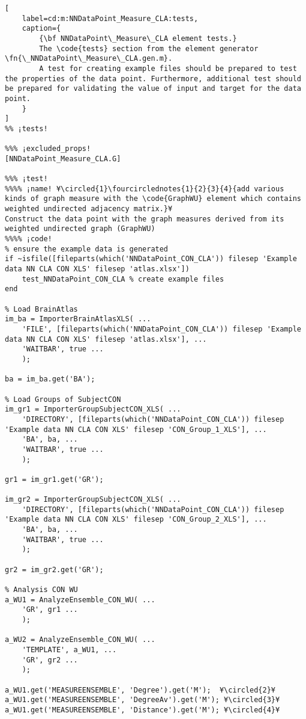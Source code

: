 \documentclass{tufte-handout}
\begin{document}
\begin{lstlisting}[
	label=cd:m:NNDataPoint_Measure_CLA:tests,
	caption={
		{\bf NNDataPoint\_Measure\_CLA element tests.}
		The \code{tests} section from the element generator \fn{\_NNDataPoint\_Measure\_CLA.gen.m}.
		A test for creating example files should be prepared to test the properties of the data point. Furthermore, additional test should be prepared for validating the value of input and target for the data point.
	}
]		
%% ¡tests!

%%% ¡excluded_props!
[NNDataPoint_Measure_CLA.G]

%%% ¡test!
%%%% ¡name! ¥\circled{1}\fourcirclednotes{1}{2}{3}{4}{add various kinds of graph measure with the \code{GraphWU} element which contains weighted undirected adjacency matrix.}¥
Construct the data point with the graph measures derived from its weighted undirected graph (GraphWU) 
%%%% ¡code!
% ensure the example data is generated
if ~isfile([fileparts(which('NNDataPoint_CON_CLA')) filesep 'Example data NN CLA CON XLS' filesep 'atlas.xlsx'])
    test_NNDataPoint_CON_CLA % create example files
end

% Load BrainAtlas
im_ba = ImporterBrainAtlasXLS( ...
    'FILE', [fileparts(which('NNDataPoint_CON_CLA')) filesep 'Example data NN CLA CON XLS' filesep 'atlas.xlsx'], ...
    'WAITBAR', true ...
    );

ba = im_ba.get('BA');

% Load Groups of SubjectCON
im_gr1 = ImporterGroupSubjectCON_XLS( ...
    'DIRECTORY', [fileparts(which('NNDataPoint_CON_CLA')) filesep 'Example data NN CLA CON XLS' filesep 'CON_Group_1_XLS'], ...
    'BA', ba, ...
    'WAITBAR', true ...
    );

gr1 = im_gr1.get('GR');

im_gr2 = ImporterGroupSubjectCON_XLS( ...
    'DIRECTORY', [fileparts(which('NNDataPoint_CON_CLA')) filesep 'Example data NN CLA CON XLS' filesep 'CON_Group_2_XLS'], ...
    'BA', ba, ...
    'WAITBAR', true ...
    );

gr2 = im_gr2.get('GR');

% Analysis CON WU
a_WU1 = AnalyzeEnsemble_CON_WU( ...
    'GR', gr1 ...
    );

a_WU2 = AnalyzeEnsemble_CON_WU( ...
    'TEMPLATE', a_WU1, ...
    'GR', gr2 ...
    );

a_WU1.get('MEASUREENSEMBLE', 'Degree').get('M');  ¥\circled{2}¥
a_WU1.get('MEASUREENSEMBLE', 'DegreeAv').get('M'); ¥\circled{3}¥
a_WU1.get('MEASUREENSEMBLE', 'Distance').get('M'); ¥\circled{4}¥


\end{lstlisting}
\end{document}
